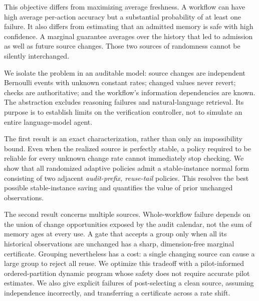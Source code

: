 \documentclass{article}
\newcommand{\1}{\mathbf 1}
\begin{document}
This objective differs from maximizing average freshness. A workflow can have high average per-action accuracy but a substantial probability of at least one failure. It also differs from estimating that an admitted memory is safe with high confidence. A marginal guarantee averages over the history that led to admission as well as future source changes. Those two sources of randomness cannot be silently interchanged.

We isolate the problem in an auditable model: source changes are independent Bernoulli events with unknown constant rates; changed values never revert; checks are authoritative; and the workflow's information dependencies are known. The abstraction excludes reasoning failures and natural-language retrieval. Its purpose is to establish limits on the verification controller, not to simulate an entire language-model agent.

The first result is an exact characterization, rather than only an impossibility bound. Even when the realized source is perfectly stable, a policy required to be reliable for every unknown change rate cannot immediately stop checking. We show that all randomized adaptive policies admit a stable-instance normal form consisting of two adjacent \emph{audit-prefix, reuse-tail} policies. This resolves the best possible stable-instance saving and quantifies the value of prior unchanged observations.

The second result concerns multiple sources. Whole-workflow failure depends on the union of change opportunities exposed by the audit calendar, not the sum of memory ages at every use. A gate that accepts a group only when all its historical observations are unchanged has a sharp, dimension-free marginal certificate. Grouping nevertheless has a cost: a single changing source can cause a large group to reject all reuse. We optimize this tradeoff with a pilot-informed ordered-partition dynamic program whose safety does not require accurate pilot estimates. We also give explicit failures of post-selecting a clean source, assuming independence incorrectly, and transferring a certificate across a rate shift.
\end{document}

